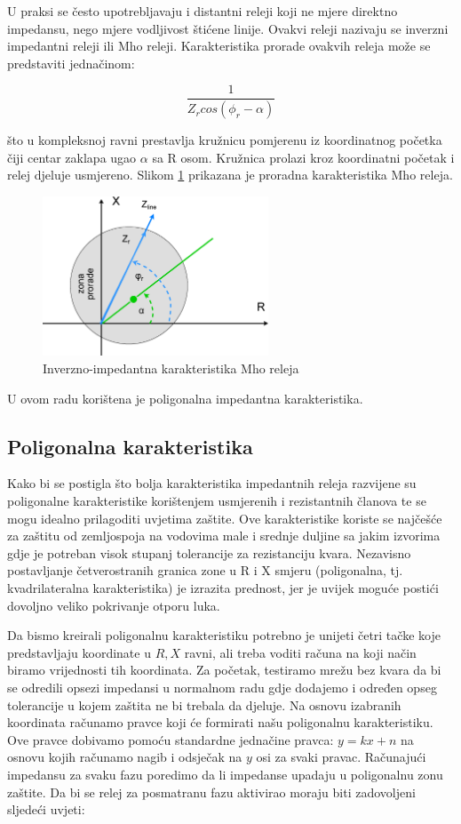 U praksi se često upotrebljavaju i distantni releji koji ne mjere direktno impedansu, nego mjere vodljivost štićene linije. Ovakvi releji nazivaju se inverzni impedantni releji ili Mho releji. Karakteristika prorade ovakvih releja može se predstaviti jednačinom:

\[\frac{1}{Z_rcos(\phi_r-\alpha)}\]

što u kompleksnoj ravni prestavlja kružnicu pomjerenu iz koordinatnog početka čiji centar zaklapa ugao $\alpha$ sa R osom. Kružnica prolazi kroz koordinatni početak i relej djeluje usmjereno. Slikom \ref{fig:slika2} prikazana je proradna karakteristika Mho releja. \cite{prva}

\begin{figure}[H]
  \centering
  \includegraphics[width=0.6\textwidth]{slika2}
  \caption{Inverzno-impedantna karakteristika Mho releja}
  \label{fig:slika2}
\end{figure}

U ovom radu korištena je poligonalna impedantna karakteristika.

\subsection{Poligonalna karakteristika}
\label{poligon}

Kako bi se postigla što bolja karakteristika impedantnih releja razvijene su poligonalne karakteristike korištenjem usmjerenih i rezistantnih članova te se mogu idealno prilagoditi uvjetima zaštite. Ove karakteristike koriste se najčešće za zaštitu od zemljospoja na vodovima male i srednje duljine sa jakim izvorima gdje je potreban visok stupanj tolerancije za rezistanciju kvara. Nezavisno postavljanje četverostranih granica zone u R i X smjeru (poligonalna, tj. kvadrilateralna karakteristika) je izrazita prednost, jer je uvijek moguće postići dovoljno veliko pokrivanje otporu luka.  \cite{druga}

Da bismo kreirali poligonalnu karakteristiku potrebno je unijeti četri tačke koje predstavljaju koordinate u ${R, X}$ ravni, ali treba voditi računa na koji način biramo vrijednosti tih koordinata. Za početak, testiramo mrežu bez kvara da bi se odredili opsezi impedansi u normalnom radu gdje dodajemo i određen opseg tolerancije u kojem zaštita ne bi trebala da djeluje. Na osnovu izabranih koordinata računamo pravce koji će formirati našu poligonalnu karakteristiku. Ove pravce dobivamo pomoću standardne jednačine pravca: $y=kx+n$ na osnovu kojih računamo nagib i odsječak na $y$ osi za svaki pravac. Računajući impedansu za svaku fazu poredimo da li impedanse upadaju u poligonalnu zonu zaštite. Da bi se relej za posmatranu fazu aktivirao moraju biti zadovoljeni sljedeći uvjeti:

